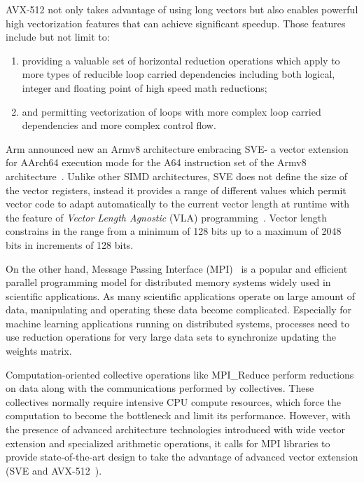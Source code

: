 \documentclass[sigconf,review]{acmart}
\newcommand{\mpi}[0]{\textsc{MPI}\xspace}
\newcommand{\arm}[0]{Arm\xspace}
\newcommand{\sve}[0]{\textsc{SVE}\xspace}
\begin{document}
AVX-512 not only takes advantage of using long vectors but also enables powerful high
vectorization features that can achieve significant speedup. Those features
include but not limit to:
\begin{enumerate}
  \item providing a valuable set of horizontal reduction operations which apply to more
  types of reducible loop carried dependencies including both logical, integer and floating point of high speed math reductions;
  \item and permitting vectorization of loops with more complex loop carried dependencies and more complex control flow.
\end{enumerate}

\arm announced new an Armv8 architecture embracing \sve - a vector extension for AArch64
execution mode for the A64 instruction set of the
Armv8 architecture~\cite{arm-v8-ref, ARMv8-Architecture}.
Unlike other SIMD architectures, \sve does not define the size of
the vector registers, instead it provides a range of different values which permit vector
code to adapt automatically to the current vector length at runtime with the
feature of \emph{Vector Length Agnostic} (VLA) programming~\cite{Advanced-SIMD,vla-stencil}.
Vector length constrains in the range from a minimum of 128 bits up to
a maximum of 2048 bits in increments of 128 bits.

On the other hand, Message Passing Interface (\mpi)~\cite{mpi-forum} is a popular and efficient parallel
programming model for distributed memory systems widely used in scientific applications.
As many scientific applications operate on large amount of data, manipulating and operating these data become complicated.
%
Especially for machine learning applications running on distributed systems,
processes need to use reduction operations for very large data sets to
synchronize updating the weights matrix.

Computation-oriented collective operations like MPI\_Reduce perform reductions on
data along with the communications performed by collectives.
These collectives normally require intensive CPU compute resources, which force
the computation to become the bottleneck and limit its performance.
However, with the presence of advanced architecture technologies introduced
with wide vector extension and specialized arithmetic operations, it calls for
MPI libraries to provide state-of-the-art design to take the advantage of advanced vector
extension (\sve and AVX-512~\cite{avx-info, Cebrian2019}).
\end{document}
